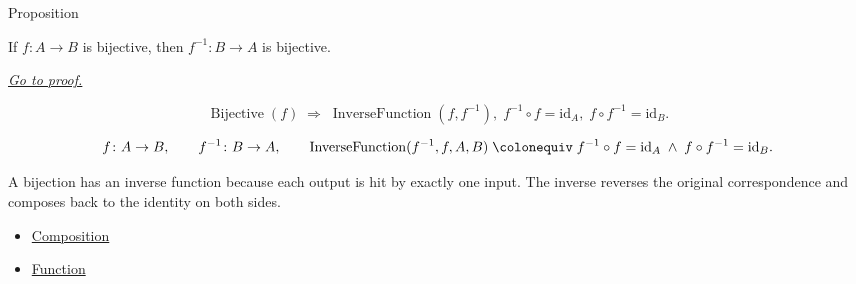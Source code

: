 \begin{propositionbox}{Proposition}
\begin{proposition}
\label{prop:inverse-bijection}
If \(f:A\to B\) is bijective, then \(f^{-1}:B\to A\) is bijective.

\smallskip\noindent
\hyperref[prf:inverse-bijection]{\textit{Go to proof.}}
\end{proposition}
\end{propositionbox}

\begin{remark*}
\[
  \operatorname{Bijective}(f)
  \;\Rightarrow\;
  \operatorname{InverseFunction}(f, f^{-1}),\;
  f^{-1}\circ f=\mathrm{id}_A,\;
  f\circ f^{-1}=\mathrm{id}_B.
\]
\end{remark*}

\begin{remark*}
\[
  f\colon A\to B,\qquad
  f^{-1}\colon B\to A,\qquad
  \operatorname{InverseFunction}(f^{-1}, f, A, B)
  \;\colonequiv\;
  f^{-1}\circ f = \mathrm{id}_A \;\wedge\; f\circ f^{-1}=\mathrm{id}_B.
\]
\end{remark*}

\begin{remark*}[Interpretation]
A bijection has an inverse function because each output is hit by exactly one
input. The inverse reverses the original correspondence and composes back to
the identity on both sides.
\end{remark*}

\begin{dependencies}
\begin{itemize}
  \item \hyperref[def:composition]{Composition}
  \item \hyperref[def:function]{Function}
\end{itemize}
\end{dependencies}

